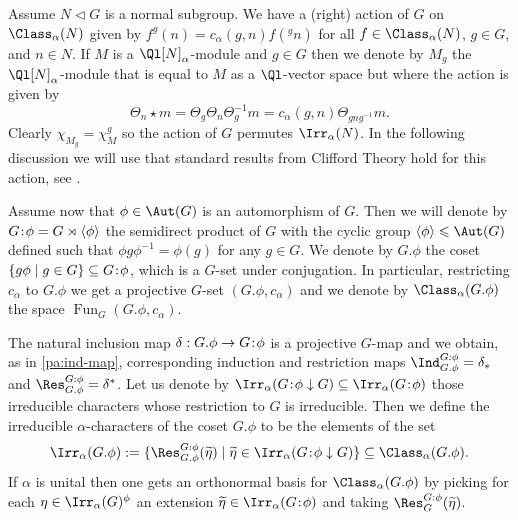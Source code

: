 \documentclass[eqthmnum,nocolour,skinny]{jt-calcs}
\DeclareMathOperator{\Fun}{Fun}
\newcommand\sd{
	\mathchoice{\mkern1.5mu}{\mkern1.5mu}{}{}%
	{:}%
	\mathchoice{\mkern1.5mu}{\mkern1.5mu}{}{}
}
\begin{document}
\begin{pa}
Assume $N \lhd G$ is a normal subgroup. We have a (right) action of $G$ on $\Class_{\alpha}(N)$ given by $f^g(n) = c_{\alpha}(g,n)f({}^gn)$ for all $f \in \Class_{\alpha}(N)$, $g \in G$, and $n \in N$. If $M$ is a $\Ql[N]_{\alpha}$-module and $g \in G$ then we denote by $M_g$ the $\Ql[N]_{\alpha}$-module that is equal to $M$ as a $\Ql$-vector space but where the action is given by
\begin{equation*}
\Theta_n \star m = \Theta_g\Theta_n\Theta_g^{-1}m = c_{\alpha}(g,n)\Theta_{gng^{-1}}m.
\end{equation*}
Clearly $\chi_{M_g} = \chi_M^g$ so the action of $G$ permutes $\Irr_{\alpha}(N)$. In the following discussion we will use that standard results from Clifford Theory hold for this action, see \cite[Props.~1-3]{conlon:1964:twisted-group-algebras}.
\end{pa}

\begin{pa}
Assume now that $\phi \in \Aut(G)$ is an automorphism of $G$. Then we will denote by $G\sd\phi = G \rtimes \langle \phi \rangle$ the semidirect product of $G$ with the cyclic group $\langle \phi \rangle \leqslant \Aut(G)$ defined such that $\phi g\phi^{-1} = \phi(g)$ for any $g \in G$. We denote by $G.\phi$ the coset $\{g\phi \mid g \in G\} \subseteq G\sd\phi$, which is a $G$-set under conjugation. In particular, restricting $c_{\alpha}$ to $G.\phi$ we get a projective $G$-set $(G.\phi,c_{\alpha})$ and we denote by $\Class_{\alpha}(G.\phi)$ the space $\Fun_G(G.\phi,c_{\alpha})$.
\end{pa}

\begin{pa}\label{pa:ortho-basis-coset-funcs}
The natural inclusion map $\delta : G.\phi \to G\sd\phi$ is a projective $G$-map and we obtain, as in \cref{pa:ind-map}, corresponding induction and restriction maps $\Ind_{G.\phi}^{G\sd\phi} = \delta_*$ and $\Res_{G.\phi}^{G\sd\phi} = \delta^*$. Let us denote by $\Irr_{\alpha}(G\sd\phi \downarrow G) \subseteq \Irr_{\alpha}(G\sd\phi)$ those irreducible characters whose restriction to $G$ is irreducible. Then we define the irreducible $\alpha$-characters of the coset $G.\phi$ to be the elements of the set
\begin{equation*}
\Irr_{\alpha}(G.\phi) := \{\Res_{G.\phi}^{G\sd\phi}(\widetilde{\eta}) \mid \widetilde{\eta} \in \Irr_{\alpha}(G\sd\phi \downarrow G)\} \subseteq \Class_{\alpha}(G.\phi).
\end{equation*}
If $\alpha$ is unital then one gets an orthonormal basis for $\Class_{\alpha}(G.\phi)$ by picking for each $\eta \in \Irr_{\alpha}(G)^{\phi}$ an extension $\widetilde{\eta} \in \Irr_{\alpha}(G\sd\phi)$ and taking $\Res_G^{G\sd\phi}(\widetilde{\eta})$.
\end{pa}
\end{document}
